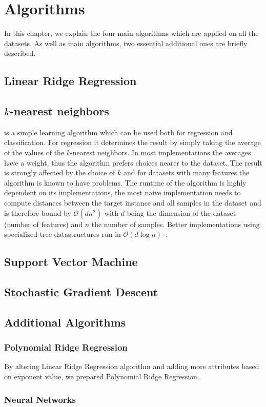 \section{Algorithms}
In this chapter, we explain the four main algorithms which are applied on all the datasets. As well as main algorithms, two essential additional ones are briefly described.

\subsection{Linear Ridge Regression}
\subsection{$k$-nearest neighbors}
is a simple learning algorithm which can be used both for regression and classification. For regression it determines the result by simply taking the average of the values of the $k$-nearest neighbors. In most implementations the averages have a weight, thus the algorithm prefers choices nearer to the dataset. The result is strongly affected by the choice of $k$ and for datasets with many features the algorithm is known to have problems. The runtime of the algorithm is highly dependent on its implementations, the most naive implementation needs to compute distances between the target instance and all samples in the dataset and is therefore bound by $\mathcal{O}(dn^2)$ with $d$ being the dimension of the dataset (number of features) and $n$ the number of samples. Better implementations using specialized tree datastructures run in $\mathcal{O}(d\log n)$~\cite{alg:knn}.
\subsection{Support Vector Machine}
\subsection{Stochastic Gradient Descent}

\subsection{Additional Algorithms}
\subsubsection{Polynomial Ridge Regression}
By altering Linear Ridge Regression algorithm and adding more attributes based on exponent value, we prepared Polynomial Ridge Regression.
\subsubsection{Neural Networks}

